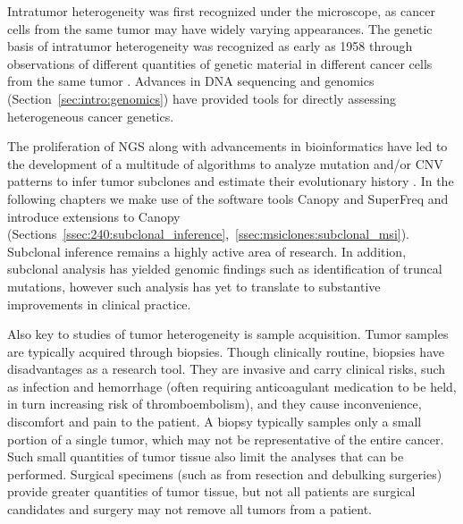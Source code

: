 Intratumor heterogeneity was first recognized under the microscope, as cancer cells from the same tumor may have widely varying appearances. The genetic basis of intratumor heterogeneity was recognized as early as 1958 through observations of different quantities of genetic material in different cancer cells from the same tumor \cite{huxley1958,mcgranahan2017}. Advances in DNA sequencing and genomics (Section~\ref{sec:intro:genomics}) have provided tools for directly assessing heterogeneous cancer genetics.

The proliferation of NGS along with advancements in bioinformatics have led to the development of a multitude of algorithms to analyze mutation and/or CNV patterns to infer tumor subclones and estimate their evolutionary history \cite{tarabichi2021}. In the following chapters we make use of the software tools Canopy \cite{canopy} and SuperFreq \cite{flensburg2020} and introduce extensions to Canopy (Sections~\ref{ssec:240:subclonal_inference},~\ref{ssec:msiclones:subclonal_msi}). Subclonal inference remains a highly active area of research. In addition, subclonal analysis has yielded genomic findings such as identification of truncal mutations, however such analysis has yet to translate to substantive improvements in clinical practice.

Also key to studies of tumor heterogeneity is sample acquisition. Tumor samples are typically acquired through biopsies. Though clinically routine, biopsies have disadvantages as a research tool. They are invasive and carry clinical risks, such as infection and hemorrhage (often requiring anticoagulant medication to be held, in turn increasing risk of thromboembolism), and they cause inconvenience, discomfort and pain to the patient. A biopsy typically samples only a small portion of a single tumor, which may not be representative of the entire cancer. Such small quantities of tumor tissue also limit the analyses that can be performed. Surgical specimens (such as from resection and debulking surgeries) provide greater quantities of tumor tissue, but not all patients are surgical candidates and surgery may not remove all tumors from a patient.

